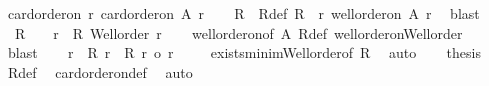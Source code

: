 \begin{isabellebody}
\isamarkupfalse%
\ card{\isacharunderscore}{\kern0pt}order{\isacharunderscore}{\kern0pt}on{\isacharcolon}{\kern0pt}\ {\isachardoublequoteopen}{\isasymexists}r{\isachardot}{\kern0pt}\ card{\isacharunderscore}{\kern0pt}order{\isacharunderscore}{\kern0pt}on\ A\ r{\isachardoublequoteclose}\isanewline
%
\isadelimproof
%
\endisadelimproof
%
\isatagproof
{}\isamarkupfalse%
{\isacharminus}{\kern0pt}\isanewline
\ \ \isamarkupfalse%
\ R\ \ R{\isacharunderscore}{\kern0pt}def{\isacharcolon}{\kern0pt}\ {\isachardoublequoteopen}R\ {\isacharequal}{\kern0pt}\ {\isacharbraceleft}{\kern0pt}r{\isachardot}{\kern0pt}\ well{\isacharunderscore}{\kern0pt}order{\isacharunderscore}{\kern0pt}on\ A\ r{\isacharbraceright}{\kern0pt}{\isachardoublequoteclose}\ \isamarkupfalse%
\ blast\isanewline
\ \ \isamarkupfalse%
\ {}{\isacharcolon}{\kern0pt}\ {\isachardoublequoteopen}R\ {\isasymnoteq}\ {\isacharbraceleft}{\kern0pt}{\isacharbraceright}{\kern0pt}\ {\isasymand}\ {\isacharparenleft}{\kern0pt}{\isasymforall}r\ {\isasymin}\ R{\isachardot}{\kern0pt}\ Well{\isacharunderscore}{\kern0pt}order\ r{\isacharparenright}{\kern0pt}{\isachardoublequoteclose}\isanewline
\ \ \isamarkupfalse%
\ well{\isacharunderscore}{\kern0pt}order{\isacharunderscore}{\kern0pt}on{\isacharbrackleft}{\kern0pt}of\ A{\isacharbrackright}{\kern0pt}\ R{\isacharunderscore}{\kern0pt}def\ well{\isacharunderscore}{\kern0pt}order{\isacharunderscore}{\kern0pt}on{\isacharunderscore}{\kern0pt}Well{\isacharunderscore}{\kern0pt}order\ \isamarkupfalse%
\ blast\isanewline
\ \ \isamarkupfalse%
\ {\isachardoublequoteopen}{\isasymexists}r\ {\isasymin}\ R{\isachardot}{\kern0pt}\ {\isasymforall}r{\isacharprime}{\kern0pt}\ {\isasymin}\ R{\isachardot}{\kern0pt}\ r\ {\isasymle}o\ r{\isacharprime}{\kern0pt}{\isachardoublequoteclose}\isanewline
\ \ \isamarkupfalse%
\ \ exists{\isacharunderscore}{\kern0pt}minim{\isacharunderscore}{\kern0pt}Well{\isacharunderscore}{\kern0pt}order{\isacharbrackleft}{\kern0pt}of\ R{\isacharbrackright}{\kern0pt}\ \isamarkupfalse%
\ auto\isanewline
\ \ \isamarkupfalse%
\ {\isacharquery}{\kern0pt}thesis\ \isamarkupfalse%
\ R{\isacharunderscore}{\kern0pt}def\ \isamarkupfalse%
\ card{\isacharunderscore}{\kern0pt}order{\isacharunderscore}{\kern0pt}on{\isacharunderscore}{\kern0pt}def\ \isamarkupfalse%
\ auto\isanewline
{}\isamarkupfalse%
%

\end{isabellebody}
